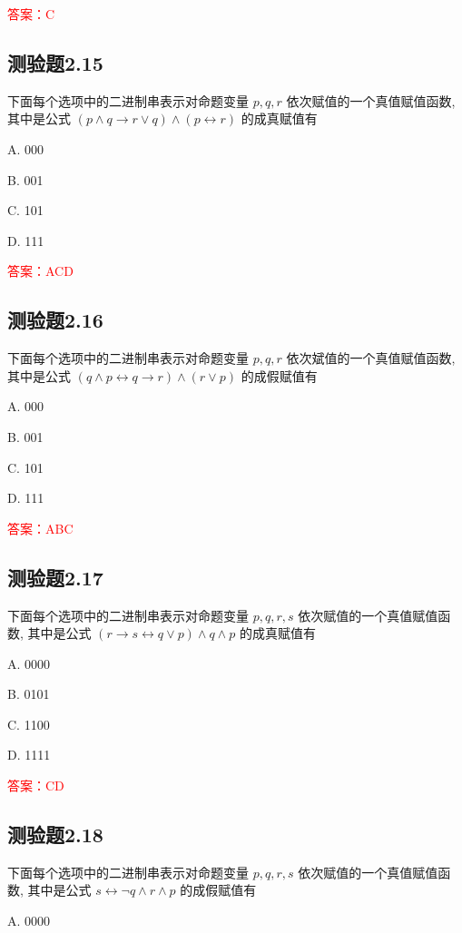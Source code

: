\documentclass[UTF8, heading=true]{ctexart}
\begin{document}
\textcolor{red}{答案：C}

\subsection{测验题2.15}

下面每个选项中的二进制串表示对命题变量 $p, q, r$ 依次赋值的一个真值赋值函数, 其中是公式 $(p \wedge q \rightarrow r \vee q) \wedge(p \leftrightarrow r)$ 的成真赋值有 $\qquad$

A. 000

B. 001

C. 101

D. 111

\textcolor{red}{答案：ACD}


\subsection{测验题2.16}

下面每个选项中的二进制串表示对命题变量 $p, q, r$ 依次斌值的一个真值赋值函数, 其中是公式 $(q \wedge p \leftrightarrow q \rightarrow r) \wedge(r \vee p)$ 的成假赋值有 $\qquad$

A. 000

B. 001

C. 101

D. 111

\textcolor{red}{答案：ABC}

\subsection{测验题2.17}

下面每个选项中的二进制串表示对命题变量 $p, q, r, s$ 依次赋值的一个真值赋值函数, 其中是公式 $(r \rightarrow s \leftrightarrow q \vee p) \wedge q \wedge p$ 的成真赋值有 $\qquad$

A. 0000

B. 0101

C. 1100

D. 1111

\textcolor{red}{答案：CD}

\subsection{测验题2.18}

下面每个选项中的二进制串表示对命题变量 $p, q, r, s$ 依次赋值的一个真值赋值函数, 其中是公式 $s \leftrightarrow \neg q \wedge r \wedge p$ 的成假赋值有 $\qquad$

A. 0000
\end{document}
